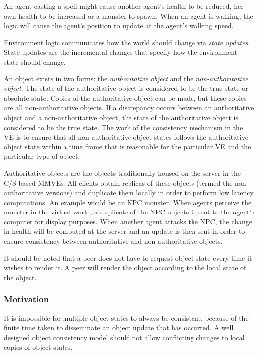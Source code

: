An agent casting a spell might cause another agent's health to be reduced, her own health to be increased or a monster to spawn. When an agent is walking, the logic will cause the agent's position to update at the agent's walking speed.

Environment logic communicates how the world should change via \emph{state updates}. State updates are the incremental changes that specify how the environment state should change.

An object exists in two forms: the \emph{authoritative object} and the \emph{non-authoritative object}. The state of the authoritative object is considered to be the true state or absolute state. Copies of the authoritative object can be made, but these copies are all non-authoritative objects. If a discrepancy occurs between an authoritative object and a non-authoritative object, the state of the authoritative object is considered to be the true state. The work of the consistency mechanism in the VE is to ensure that all non-authoritative object states follows the authoritative object state within a time frame that is reasonable for the particular VE and the particular type of object.

Authoritative objects are the objects traditionally housed on the server in the C/S based MMVEs. All clients obtain replicas of these objects (termed the non-authoritative versions) and duplicate them locally in order to perform low latency computations. An example would be an NPC monster. When agents perceive the monster in the virtual world, a duplicate of the NPC objects is sent to the agent's computer for display purposes. When another agent attacks the NPC, the change in health will be computed at the server and an update is then sent in order to ensure consistency between authoritative and non-authoritative objects.

It should be noted that a peer does not have to request object state every time it wishes to render it. A peer will render the object according to the local state of the object.

\subsubsection{Motivation}

It is impossible for multiple object states to always be consistent, because of the finite time taken to disseminate an object update that has occurred. A well designed object consistency model should not allow conflicting changes to local copies of object states.

